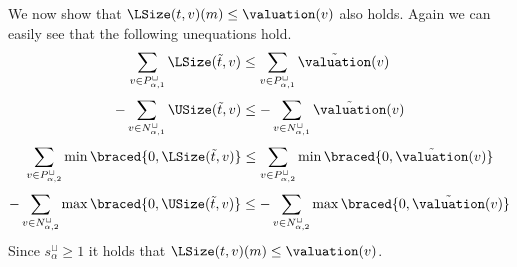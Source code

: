 We now show that $\LSize(t, v)(m) \leq \valuation(v)$ also holds.
Again we can easily see that the following unequations hold.
\[ \sum_{v \in P_{\alpha,1}^\sqcup} \LSize(\tilde{t}, v) \leq \sum_{v \in P_{\alpha,1}^\sqcup} \tilde{\valuation}(v) \]
\[ - \sum_{v \in N_{\alpha,1}^\sqcup} \USize(\tilde{t}, v) \leq - \sum_{v \in N_{\alpha,1}^\sqcup} \tilde{\valuation}(v) \]
\[ \sum_{v \in P_{\alpha,2}^\sqcup} \min \braced{0,\LSize(\tilde{t}, v)} \leq \sum_{v \in P_{\alpha,2}^\sqcup} \min \braced{0,\tilde{\valuation}(v)} \]
\[ - \sum_{v \in N_{\alpha,2}^\sqcup} \max \braced{0,\USize(\tilde{t}, v)} \leq - \sum_{v \in N_{\alpha,2}^\sqcup} \max \braced{0,\tilde{\valuation}(v)} \]
Since $s^\sqcup_\alpha \geq 1$ it holds that $\LSize(t, v)(m) \leq \valuation(v)$.
